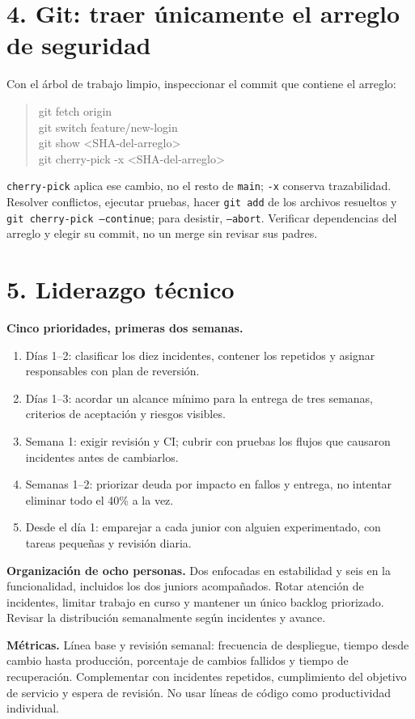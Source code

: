 \documentclass[11pt,a4paper]{article}
\newcommand{\tagline}[1]{\textbf{#1}\enspace}
\begin{document}
\section{4. Git: traer únicamente el arreglo de seguridad}
Con el árbol de trabajo limpio, inspeccionar el commit que contiene el arreglo:
\begin{quote}\small\ttfamily
 git fetch origin\\
 git switch feature/new-login\\
 git show <SHA-del-arreglo>\\
 git cherry-pick -x <SHA-del-arreglo>
\end{quote}
\texttt{cherry-pick} aplica ese cambio, no el resto de \texttt{main}; \texttt{-x} conserva trazabilidad. Resolver conflictos, ejecutar pruebas, hacer \texttt{git add} de los archivos resueltos y \texttt{git cherry-pick --continue}; para desistir, \texttt{--abort}. Verificar dependencias del arreglo y elegir su commit, no un merge sin revisar sus padres.

\section{5. Liderazgo técnico}
\tagline{Cinco prioridades, primeras dos semanas.}
\begin{enumerate}
\item Días 1--2: clasificar los diez incidentes, contener los repetidos y asignar responsables con plan de reversión.
\item Días 1--3: acordar un alcance mínimo para la entrega de tres semanas, criterios de aceptación y riesgos visibles.
\item Semana 1: exigir revisión y CI; cubrir con pruebas los flujos que causaron incidentes antes de cambiarlos.
\item Semanas 1--2: priorizar deuda por impacto en fallos y entrega, no intentar eliminar todo el 40\% a la vez.
\item Desde el día 1: emparejar a cada junior con alguien experimentado, con tareas pequeñas y revisión diaria.
\end{enumerate}

\tagline{Organización de ocho personas.} Dos enfocadas en estabilidad y seis en la funcionalidad, incluidos los dos juniors acompañados. Rotar atención de incidentes, limitar trabajo en curso y mantener un único backlog priorizado. Revisar la distribución semanalmente según incidentes y avance.

\tagline{Métricas.} Línea base y revisión semanal: frecuencia de despliegue, tiempo desde cambio hasta producción, porcentaje de cambios fallidos y tiempo de recuperación. Complementar con incidentes repetidos, cumplimiento del objetivo de servicio y espera de revisión. No usar líneas de código como productividad individual.
\end{document}

